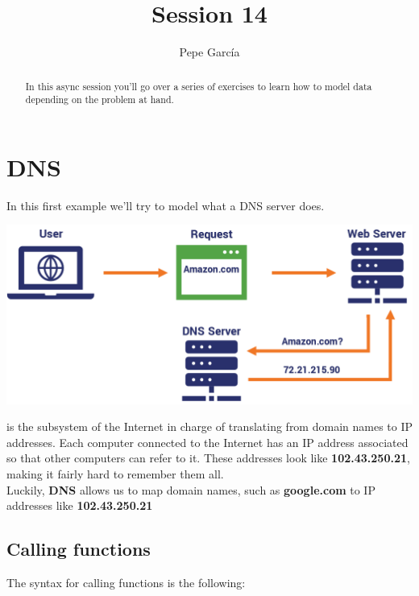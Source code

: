 \documentclass{tufte-handout}
\title{Session 14}
\author[Pepe García]{Pepe García}
\begin{document}
\maketitle%

\begin{abstract}
  \noindent
  In this async session you'll go over a series of exercises to learn how to
  model data depending on the problem at hand.
\end{abstract}


\section{DNS}\label{sec:dns}

In this first example we'll try to model what a DNS server does.

\begin{marginfigure}%
  \includegraphics[width=\linewidth]{dns.png}
  \caption{ is the subsystem of the Internet in charge of
    translating from domain names to IP addresses.  Each computer connected to the
    Internet has an IP address associated so that other computers can refer to it.
    These addresses look like \textbf{102.43.250.21}, making it fairly hard to
    remember them all.\\Luckily, \textbf{DNS} allows us to map domain names, such as
    \textbf{google.com} to IP addresses like \textbf{102.43.250.21}}
  \label{fig:marginfig}
\end{marginfigure}



\subsection{Calling functions}\label{sec:callingfunctions}

The syntax for calling functions is the following:
\end{document}
